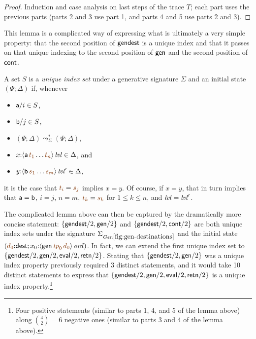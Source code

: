 \begin{proof}
  Induction and case analysis on last steps of the trace $T$; each
  part uses the previous parts (parts 2 and 3 use part 1, and parts 4
  and 5 use parts 2 and 3).
\end{proof}

This lemma is a complicated way of expressing what is ultimately a
very simple property: that the second position of ${\sf gendest}$ is a
unique index and that it passes on that unique indexing to the second
position of ${\sf gen}$ and the second position of ${\sf cont}$. 

\bigskip
\begin{definition}
A set $S$ is a {\em unique index set} under a generative signature
$\Sigma$ and an initial state $(\Psi; \Delta)$ if, whenever
\begin{itemize}
\item ${\sf a}/i \in S$, 
\item ${\sf b}/j \in S$, 
\item $(\Psi; \Delta) \leadsto^*_{\Sigma} (\Psi; \Delta)$, 
\item $x{:}\islvl{\susp{{\sf a}\,\lf{t_1}\ldots \lf{t_n}}} \in \Delta$, and
\item $y{:}\islvl{\susp{{\sf b}\,\lf{s_1}\ldots \lf{s_m}}}' \in \Delta$,
\end{itemize}
it is the case that $\lf{t_i} = \lf{s_j}$ implies $x = y$. Of course, if
$x = y$, that in turn implies that ${\sf a} = {\sf b}$, 
$i = j$, $n = m$, $\lf{t_k} = \lf{s_k}$ for $1 \leq k \leq n$, and 
${\it lvl} = {\it lvl}'$. 
\end{definition}
\bigskip

The complicated lemma above can then be captured by the dramatically
more concise statement: $\{ {\sf gendest}/2, {\sf gen}/2 \}$ and $\{
{\sf gendest}/2, {\sf cont}/2 \}$ are both unique index sets under the
signature $\siggendests$ and the initial state $(\lf{d_0}{:}{\sf
  dest}; x_0{:}\istrue{\susp{{\sf gen}\,\lf{{\it
        tp}_0}\,\lf{d_0}}})$. In fact, we can extend the first unique
index set to $\{ {\sf gendest}/2, {\sf gen}/2, {\sf eval}/2, {\sf
  retn}/2 \}$. Stating that $\{ {\sf gendest}/2, {\sf gen}/2 \}$ was a
unique index property previously required 3 distinct statements, and
it would take 10 distinct statements to express that $\{ {\sf
  gendest}/2, {\sf gen}/2, {\sf eval}/2, {\sf retn}/2 \}$ is a unique
index property.\footnote{Four positive statements (similar to parts 1, 4, and 5 of the lemma above) along ${{4}\choose{2}} =
  6$ negative ones (similar to parts 3 and 4 of the lemma above).}

